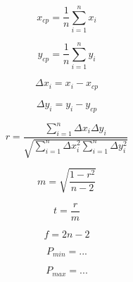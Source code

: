 \documentclass[11pt,a4paper]{article}
\begin{document}
$$ x_{cp} = \frac{1}{n} \sum_{i=1}^nx_i $$

$$ y_{cp} = \frac{1}{n} \sum_{i=1}^ny_i $$

$$ \Delta x_i = x_i - x_{cp} $$

$$ \Delta y_i = y_i - y_{cp} $$

$$ r = \frac{\sum_{i=1}^n{\Delta x_i \Delta y_i}}{\sqrt{\sum_{i=1}^n{\Delta x_i^2} \sum_{i=1}^n{\Delta y_i^2}}} $$

$$ m = \sqrt{\frac{1 - r^2}{n - 2}}  $$

$$ t = \frac{r}{m} $$

$$ f = 2n - 2 $$

$$ P_{min} = ... $$

$$ P_{max} = ... $$
\end{document}
